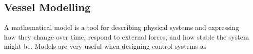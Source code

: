 \subsection{Vessel Modelling} \label{CHAP: Vessel Modelling}
A mathematical model is a tool for describing physical systems and expressing how they change over time, respond to external forces, and how stable the system might be. Models are very useful when designing control systems as
